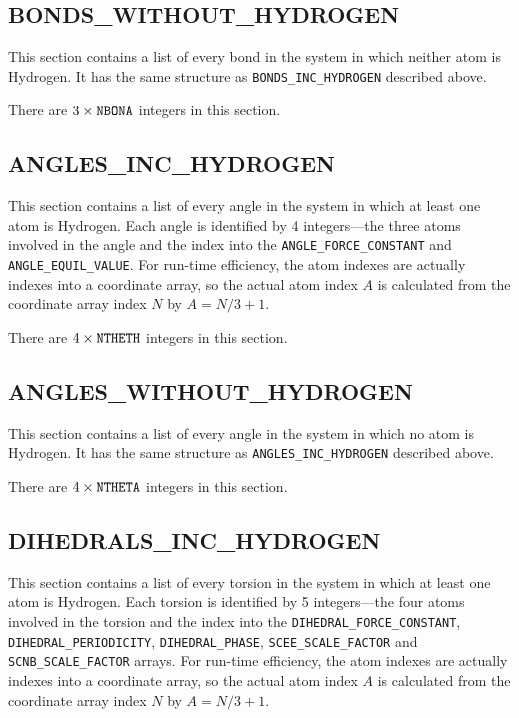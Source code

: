 \subsection*{BONDS\_WITHOUT\_HYDROGEN}

This section contains a list of every bond in the system in which neither atom
is Hydrogen. It has the same structure as {\tt BONDS\_INC\_HYDROGEN} described
above.


\noindent There are $3 \times {\tt NBONA}$ integers in this section.

\subsection*{ANGLES\_INC\_HYDROGEN}

This section contains a list of every angle in the system in which at least one
atom is Hydrogen. Each angle is identified by 4 integers---the three atoms
involved in the angle and the index into the {\tt ANGLE\_FORCE\_CONSTANT} and
{\tt ANGLE\_EQUIL\_VALUE}. For run-time efficiency, the atom indexes are
actually indexes into a coordinate array, so the actual atom index $A$ is
calculated from the coordinate array index $N$ by $A = N / 3 + 1$.


\noindent There are $4 \times {\tt NTHETH}$ integers in this section.

\subsection*{ANGLES\_WITHOUT\_HYDROGEN}

This section contains a list of every angle in the system in which no atom is
Hydrogen. It has the same structure as {\tt ANGLES\_INC\_HYDROGEN} described
above.


\noindent There are $4 \times {\tt NTHETA}$ integers in this section.

\subsection*{DIHEDRALS\_INC\_HYDROGEN}

This section contains a list of every torsion in the system in which at least
one atom is Hydrogen. Each torsion is identified by 5 integers---the four atoms
involved in the torsion and the index into the {\tt DIHEDRAL\_FORCE\_CONSTANT},
{\tt DIHEDRAL\_PERIODICITY}, {\tt DIHEDRAL\_PHASE}, {\tt SCEE\_SCALE\_FACTOR}
and {\tt SCNB\_SCALE\_FACTOR} arrays. For run-time efficiency, the atom indexes
are actually indexes into a coordinate array, so the actual atom index $A$ is
calculated from the coordinate array index $N$ by $A = N / 3 + 1$.

